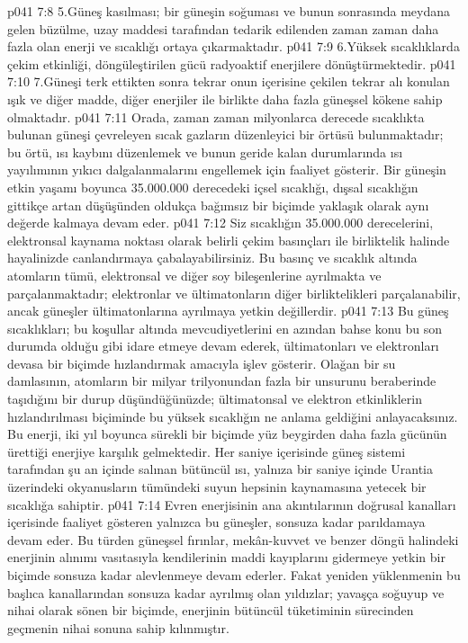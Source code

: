 \vs p041 7:8 5.\bibnobreakspace Güneş kasılması; bir güneşin soğuması ve bunun sonrasında meydana gelen büzülme, uzay maddesi tarafından tedarik edilenden zaman zaman daha fazla olan enerji ve sıcaklığı ortaya çıkarmaktadır.
\vs p041 7:9 6.\bibnobreakspace Yüksek sıcaklıklarda çekim etkinliği, döngüleştirilen gücü radyoaktif enerjilere dönüştürmektedir.
\vs p041 7:10 7.\bibnobreakspace Güneşi terk ettikten sonra tekrar onun içerisine çekilen tekrar alı konulan ışık ve diğer madde, diğer enerjiler ile birlikte daha fazla güneşsel kökene sahip olmaktadır.
\vs p041 7:11 Orada, zaman zaman milyonlarca derecede sıcaklıkta bulunan güneşi çevreleyen sıcak gazların düzenleyici bir örtüsü bulunmaktadır; bu örtü, ısı kaybını düzenlemek ve bunun geride kalan durumlarında ısı yayılımının yıkıcı dalgalanmalarını engellemek için faaliyet gösterir. Bir güneşin etkin yaşamı boyunca 35.000.000 derecedeki içsel sıcaklığı, dışsal sıcaklığın gittikçe artan düşüşünden oldukça bağımsız bir biçimde yaklaşık olarak aynı değerde kalmaya devam eder.
\vs p041 7:12 Siz sıcaklığın 35.000.000 derecelerini, elektronsal kaynama noktası olarak belirli çekim basınçları ile birliktelik halinde hayalinizde canlandırmaya çabalayabilirsiniz. Bu basınç ve sıcaklık altında atomların tümü, elektronsal ve diğer soy bileşenlerine ayrılmakta ve parçalanmaktadır; elektronlar ve ültimatonların diğer birliktelikleri parçalanabilir, ancak güneşler ültimatonlarına ayrılmaya yetkin değillerdir.
\vs p041 7:13 Bu güneş sıcaklıkları; bu koşullar altında mevcudiyetlerini en azından bahse konu bu son durumda olduğu gibi idare etmeye devam ederek, ültimatonları ve elektronları devasa bir biçimde hızlandırmak amacıyla işlev gösterir. Olağan bir su damlasının, atomların bir milyar trilyonundan fazla bir unsurunu beraberinde taşıdığını bir durup düşündüğünüzde; ültimatonsal ve elektron etkinliklerin hızlandırılması biçiminde bu yüksek sıcaklığın ne anlama geldiğini anlayacaksınız. Bu enerji, iki yıl boyunca sürekli bir biçimde yüz beygirden daha fazla gücünün ürettiği enerjiye karşılık gelmektedir. Her saniye içerisinde güneş sistemi tarafından şu an içinde salınan bütüncül ısı, yalnıza bir saniye içinde Urantia üzerindeki okyanusların tümündeki suyun hepsinin kaynamasına yetecek bir sıcaklığa sahiptir.
\vs p041 7:14 Evren enerjisinin ana akıntılarının doğrusal kanalları içerisinde faaliyet gösteren yalnızca bu güneşler, sonsuza kadar parıldamaya devam eder. Bu türden güneşsel fırınlar, mekân\hyp{}kuvvet ve benzer döngü halindeki enerjinin alınımı vasıtasıyla kendilerinin maddi kayıplarını gidermeye yetkin bir biçimde sonsuza kadar alevlenmeye devam ederler. Fakat yeniden yüklenmenin bu başlıca kanallarından sonsuza kadar ayrılmış olan yıldızlar; yavaşça soğuyup ve nihai olarak sönen bir biçimde, enerjinin bütüncül tüketiminin sürecinden geçmenin nihai sonuna sahip kılınmıştır.
